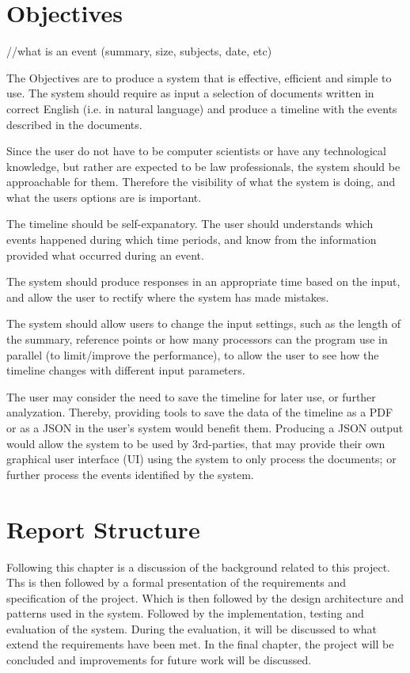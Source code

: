 \documentclass[11pt]{informatics-report}
\begin{document}
\section{Objectives}
//what is an event (summary, size, subjects, date, etc)
\par The Objectives are to produce a system that is effective, efficient and simple to use. The system should require as input a selection of documents written in correct English (i.e. in natural language) and produce a timeline with the events described in the documents.
\par Since the user do not have to be computer scientists or have any technological knowledge, but rather are expected to be law professionals, the system should be approachable for them. Therefore the visibility of what the system is doing, and what the users options are is important. 
\par The timeline should be self-expanatory. The user should understands which events happened during which time periods, and know from the information provided what occurred during an event. 
\par The system should produce responses in an appropriate time based on the input, and allow the user to rectify where the system has made mistakes. 
\par The system should allow users to change the input settings, such as the length of the summary, reference points or how many processors can the program use in parallel (to limit/improve the performance), to allow the user to see how the timeline changes with different input parameters.
\par The user may consider the need to save the timeline for later use, or further analyzation. Thereby, providing tools to save the data of the timeline as a PDF or as a JSON in the user's system would benefit them. Producing a JSON output would allow the system to be used by 3rd-parties, that may provide their own graphical user interface (UI) using the system to only process the documents; or further process the events identified by the system.
\section{Report Structure}
\par Following this chapter is a discussion of the background related to this project. Ths is then followed by a formal presentation of the requirements and specification of the project. Which is then followed by the design architecture and patterns used in the system. Followed by the implementation, testing and evaluation of the system. During the evaluation, it will be discussed to what extend the requirements have been met. In the final chapter, the project will be concluded and improvements for future work will be discussed.
\end{document}
